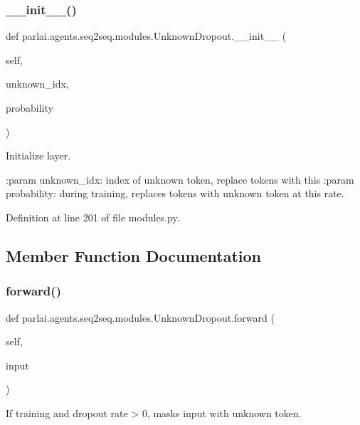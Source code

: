 \subsubsection{\texorpdfstring{\+\_\+\+\_\+init\+\_\+\+\_\+()}{\_\_init\_\_()}}
{\footnotesize\ttfamily def parlai.\+agents.\+seq2seq.\+modules.\+Unknown\+Dropout.\+\_\+\+\_\+init\+\_\+\+\_\+ (\begin{DoxyParamCaption}\item[{}]{self,  }\item[{}]{unknown\+\_\+idx,  }\item[{}]{probability }\end{DoxyParamCaption})}

\begin{DoxyVerb}Initialize layer.

:param unknown_idx: index of unknown token, replace tokens with this
:param probability: during training, replaces tokens with unknown token
            at this rate.
\end{DoxyVerb}
 

Definition at line 201 of file modules.\+py.



\subsection{Member Function Documentation}
\mbox{\label{classparlai_1_1agents_1_1seq2seq_1_1modules_1_1UnknownDropout_ae0771638ed591c911178d94cd2bdc59d}} 
\subsubsection{\texorpdfstring{forward()}{forward()}}
{\footnotesize\ttfamily def parlai.\+agents.\+seq2seq.\+modules.\+Unknown\+Dropout.\+forward (\begin{DoxyParamCaption}\item[{}]{self,  }\item[{}]{input }\end{DoxyParamCaption})}

\begin{DoxyVerb}If training and dropout rate > 0, masks input with unknown token.\end{DoxyVerb}
 

